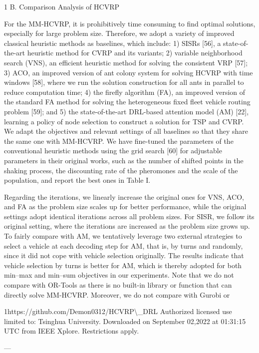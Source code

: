 \documentclass{article}
\begin{document}
	1  
	B. Comparison Analysis of HCVRP
	
	For the MM-HCVRP, it is prohibitively time consuming to find optimal solutions, especially for large problem size. Therefore, we adopt a variety of improved classical heuristic methods as baselines, which include: 1) SISRs [56], a state-of-the-art heuristic method for CVRP and its variants; 2) variable neighborhood search (VNS), an efficient heuristic method for solving the consistent VRP [57]; 3) ACO, an improved version of ant colony system for solving HCVRP with time windows [58], where we run the solution construction for all ants in parallel to reduce computation time; 4) the firefly algorithm (FA), an improved version of the standard FA method for solving the heterogeneous fixed fleet vehicle routing problem [59]; and 5) the state-of-the-art DRL-based attention model (AM) [22], learning a policy of node selection to construct a solution for TSP and CVRP. We adapt the objectives and relevant settings of all baselines so that they share the same one with MM-HCVRP. We have fine-tuned the parameters of the conventional heuristic methods using the grid search [60] for adjustable parameters in their original works, such as the number of shifted points in the shaking process, the discounting rate of the pheromones and the scale of the population, and report the best ones in Table I.
	
	Regarding the iterations, we linearly increase the original ones for VNS, ACO, and FA as the problem size scales up for better performance, while the original settings adopt identical iterations across all problem sizes. For SISR, we follow its original setting, where the iterations are increased as the problem size grows up. To fairly compare with AM, we tentatively leverage two external strategies to select a vehicle at each decoding step for AM, that is, by turns and randomly, since it did not cope with vehicle selection originally. The results indicate that vehicle selection by turns is better for AM, which is thereby adopted for both min–max and min–sum objectives in our experiments. Note that we do not compare with OR-Tools as there is no built-in library or function that can directly solve MM-HCVRP. Moreover, we do not compare with Gurobi or
	
	1https://github.com/Demon0312/HCVRP\textbackslash{}_DRL  
	Authorized licensed use limited to: Tsinghua University. Downloaded on September 02,2022 at 01:31:15 UTC from IEEE Xplore.  Restrictions apply.
	
	---
	
\end{document}
